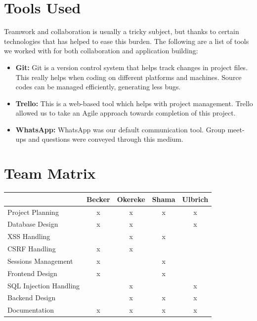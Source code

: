 \documentclass[12pt,a4paper]{article}
\begin{document}
\begin{flushleft}
	
		
	\section{Tools Used}
	Teamwork and collaboration is usually a tricky subject, but thanks to certain technologies that has helped to ease this burden. The following are a list of tools we worked with for both collaboration and application building:
	\begin{itemize}
		\item \textbf{Git:} Git is a version control system that helps track changes in project files. This really helps when coding on different platforms and machines. Source codes can be managed efficiently, generating less bugs.
		
		\item \textbf{Trello:} This is a web-based tool which helps with project management. Trello allowed us to take an Agile approach towards completion of this project.
		
		\item \textbf{WhatsApp:} WhatsApp was our default communication tool. Group meet-ups and questions were conveyed through this medium.
			
	\end{itemize}
	
	
	\section {Team Matrix}
	\begin{tabular}{|l|c|c|c|c|}
		\hline
		 & Becker & Okereke & Shama & Ulbrich \\ \hline
		 Project Planning & x & x & x & x \\ \hline
		 Database Design & x & x &  & x \\ \hline
		 XSS Handling &  & x & x &   \\ \hline
		 CSRF Handling & x & x &  &  \\ \hline
		 Sessions Management & x &  & x &  \\ \hline
		 Frontend Design & x &  & x &  \\ \hline
		 SQL Injection Handling &  & x &  & x \\ \hline
		 Backend Design &  & x & x & x \\ \hline
		 Documentation & x & x & x & x \\ \hline
	\end{tabular}
	

\end{flushleft}
\end{document}
